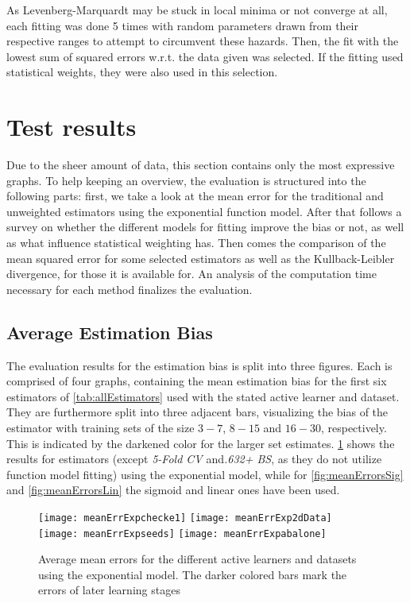 As Levenberg-Marquardt may be stuck in local minima or not converge at all, each fitting was done 5 times with random parameters drawn from their respective ranges to attempt to circumvent these hazards. Then, the fit with the lowest sum of squared errors w.r.t. the data given was selected. If the fitting used statistical weights, they were also used in this selection.

\section{Test results}
\label{evaluation:results}
Due to the sheer amount of data, this section contains only the most expressive graphs. To help keeping an overview, the evaluation is structured into the following parts: first, we take a look at the mean error for the traditional and unweighted estimators using the exponential function model. After that follows a survey on whether the different models for fitting improve the bias or not, as well as what influence statistical weighting has. Then comes the comparison of the mean squared error for some selected estimators as well as the Kullback-Leibler divergence, for those it is available for. An analysis of the computation time necessary for each method finalizes the evaluation.

\subsection{Average Estimation Bias}

The evaluation results for the estimation bias is split into three figures. Each is comprised of four graphs, containing the mean estimation bias for the first six estimators of \ref{tab:allEstimators} used with the stated active learner and dataset. They are furthermore split into three adjacent bars, visualizing the bias of the estimator with training sets of the size $3 - 7$, $8 - 15$ and $16 - 30$, respectively. This is indicated by the darkened color for the larger set estimates. \ref{fig:meanErrorsExp} shows the results for estimators (except \textit{5-Fold CV} and\textit{.632+ BS}, as they do not utilize function model fitting) using the exponential model, while for \ref{fig:meanErrorsSig} and \ref{fig:meanErrorsLin} the sigmoid and linear ones have been used.

\begin{figure}[h]
	\centering
	\texttt{[image: meanErrExpchecke1]}
	\texttt{[image: meanErrExp2dData]}
	\texttt{[image: meanErrExpseeds]}
	\texttt{[image: meanErrExpabalone]}
	\caption{Average mean errors for the different active learners and datasets using the exponential model. The darker colored bars mark the errors of later learning stages}
	\label{fig:meanErrorsExp}
\end{figure}

